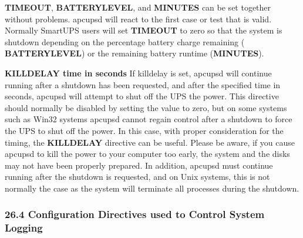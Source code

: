 \begin{description}
{\bf TIMEOUT}, {\bf BATTERYLEVEL}, and {\bf MINUTES} can be set together
without problems.  apcupsd will react to the first case or test that is valid.
Normally SmartUPS users will set {\bf TIMEOUT} to zero so that the system is
shutdown depending on the percentage battery charge remaining ({\bf
BATTERYLEVEL}) or the remaining battery runtime ({\bf MINUTES}).  

\label{KILLDELAY-_003ctime-in-seconds_003e}

\item {\bf KILLDELAY \lt{}time in seconds\gt{}}
If killdelay is set, apcupsd will continue running after a shutdown has been
requested, and after the specified time in seconds, apcupsd will attempt to
shut off the UPS the power. This directive should normally be disabled by
setting the value to zero, but on some systems such as Win32 systems apcupsd
cannot regain control after a shutdown to force the UPS to shut off the power.
In this case, with proper consideration for the timing, the {\bf KILLDELAY}
directive can be useful.  Please be aware, if you cause apcupsd to kill the
power to your computer too early, the system and the disks may not have been
properly prepared.  In addition, apcupsd must continue running after the
shutdown is requested, and on Unix systems, this is not normally the case as
the system will terminate all processes during the shutdown.  
\end{description}

\label{Configuration-Directives-used-to-Control-System-Logging}

\subsubsection*{26.4 Configuration Directives used to Control System Logging}

\label{index-Directives-Logging-245}
\label{index-Logging_002c-directives-246}


